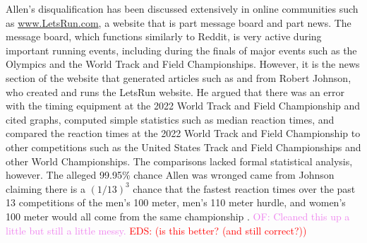 \documentclass[12pt, letterpaper, titlepage]{article}
\newcommand{\eds}[1]{\textcolor{red}{EDS: (#1)}}
\newcommand{\of}[1]{\textcolor{violet}{OF: #1}}
\begin{document}
Allen's disqualification has been discussed extensively in online communities
such as \url{www.LetsRun.com}, a website that is part message board and part
news. The message board,
which functions similarly to Reddit, is very active during important running
events, including during the finals of major events such as
the Olympics and the World Track and Field Championships.  However, it is the
news section of the website that generated articles such as \citet{johnson2022data}
and \citet{johnson2022was} from  Robert Johnson, who created and runs 
the LetsRun website.  He argued that there was an error
with the timing equipment at the 2022 World Track and Field Championship and
cited graphs, computed simple statistics such as median reaction times, and 
compared the reaction times at the 2022 World Track and Field Championship to 
other competitions
such as the United States Track and Field Championships and other World Championships.
The comparisons lacked formal statistical analysis, however. 
The alleged 99.95\% chance Allen was wronged 
came from Johnson claiming there is a $(1/13)^3$ chance that the fastest 
reaction times over the past 13 competitions of the men's 100 meter, men's 110 
meter hurdle, and women's 100 meter would all come from the same championship 
\citep{johnson2022was}.
\of{Cleaned this up a little but still a little messy.}
\eds{is this better? (and still correct?)}
\end{document}

